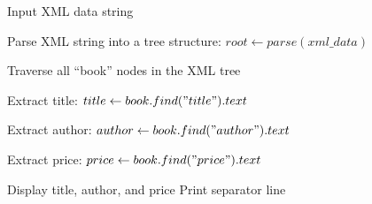 \begin{algorithm}
\caption{Parse XML Data and Display Book Information}
\begin{algorithmic}[1]

\STATE Input XML data string

\STATE Parse XML string into a tree structure:
\STATE $root \gets parse(xml\_data)$

\STATE Traverse all ``book'' nodes in the XML tree

    \STATE Extract title:
    \STATE $title \gets book.find("title").text$
    
    \STATE Extract author:
    \STATE $author \gets book.find("author").text$
    
    \STATE Extract price:
    \STATE $price \gets book.find("price").text$
    
    \STATE Display title, author, and price
    \STATE Print separator line
\ENDFOR

\end{algorithmic}
\end{algorithm}